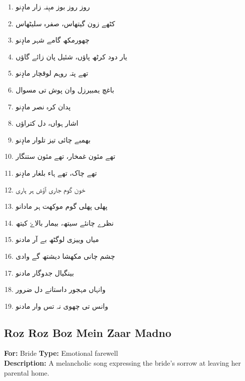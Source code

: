 \documentclass[12pt]{article}
\newcommand{\bigarabic}[1]{\fontsize{16pt}{18pt}\selectfont \textarabic{#1}}
\begin{document}
\begin{multicols}{2}
\columnbreak

\begin{RTL}
\begin{enumerate}[leftmargin=*, label=\arabic*., font=\fontsize{16pt}{18pt}\selectfont]
  \item \bigarabic{روز روز بوز میٖنہ زار مادٕنو}
  \item \bigarabic{کٹھے زون گیتھاس، صفرہ سلیٹھاس}
  \item \bigarabic{چھورمکھ گامے شہر مادٕنو}
  \item \bigarabic{یار دود کرٹھ پاؤں، شئیل پان زائے گاؤں}
  \item \bigarabic{تھے پتہ روہم لوقچار مادٕنو}
  \item \bigarabic{باغچ یمبیرزل وان پوش تی مسوال}
  \item \bigarabic{پدان کرہ نصر مادٕنو}
  \item \bigarabic{اشار ہواں، دل کتراؤں}
  \item \bigarabic{بھمبے چائی تیز تلوار مادٕنو}
  \item \bigarabic{تھے مئون غمخار، تھے مئون ستنگار}
  \item \bigarabic{تھے چاک، تھے ہاء بلغار مادٕنو}
  \item \bigarabic{خون گوم جاری آؤش ہر ہاری}
  \item \bigarabic{پھلی پھلی گوم موکھت ہر مادانو}
  \item \bigarabic{نظرے چانئے سیتھ، بیمار بالاۓ کیتھ}
  \item \bigarabic{میاں وییزی لوگٹھ بے آر مادنو}
  \item \bigarabic{چشم چانی مکھشا دیشتھ گے وادی}
  \item \bigarabic{بینگیال جدوگار مادنو}
  \item \bigarabic{وانہاں مہجور داستانے دل ضرور}
  \item \bigarabic{وانس تی چھوی نہ تس وار مادنو}
\end{enumerate}
\end{RTL}
\end{multicols}

\subsection*{Roz Roz Boz Mein Zaar Madno}
\textbf{For:} Bride \quad \textbf{Type:} Emotional farewell\\
\textbf{Description:} A melancholic song expressing the bride's sorrow at leaving her parental home.
\end{document}
